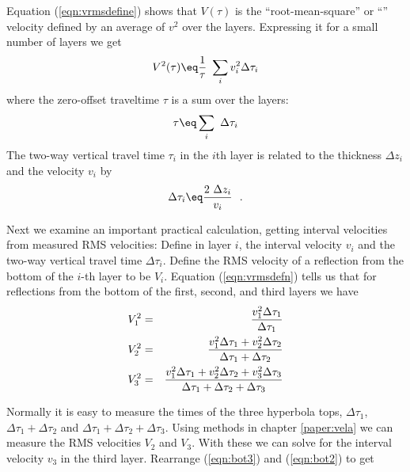 \par
Equation (\ref{eqn:vrmsdefine}) shows that
$V(\tau)$
is
the ``root-mean-square'' or
``\RMS'' velocity defined by
an average of $v^2$ over the layers.
Expressing it for a small number of layers we get
\begin{equation}
V^2(\tau) \eq \frac{1}{\tau}\  \sum_i v^2_i \Delta\tau_i
\label{eqn:vrmsdefn}
\end{equation}
where the zero-offset traveltime $\tau$ is a sum over the layers:
\begin{equation}
\tau \eq \sum_i \ \Delta\tau_i
\label{eqn:onetaudefn}
\end{equation}
The two-way vertical travel time $\tau_i$
in the $i$th layer is related to the
thickness $\Delta z_i$ and the velocity $v_i$  by
\begin{equation}
\Delta\tau_i \eq  \frac{2\ \Delta z_i}{v_i}  \ \ .
\label{eqn:twotaudefn}
\end{equation}
\par
Next we examine an important practical calculation,
getting interval velocities from measured RMS velocities:
Define
in layer $i$,
the interval velocity $v_i$
and the two-way vertical travel time $\Delta\tau_i$.
Define the RMS velocity
of a reflection
from the bottom of the $i$-th layer
to be $V_i$.
Equation (\ref{eqn:vrmsdefn}) tells us that for
reflections from the bottom of the first, second, and third layers we have
\begin{eqnarray}
V_1^2 &=& {v_1^2\Delta\tau_1
                               \over \Delta\tau_1                 }
\\
\label{eqn:bot2}
V_2^2 &=& {v_1^2\Delta\tau_1+ v_2^2\Delta\tau_2
                               \over \Delta\tau_1 + \Delta\tau_2        }
\\
\label{eqn:bot3}
V_3^2 &=& {v_1^2\Delta\tau_1+ v_2^2\Delta\tau_2 +v_3^2\Delta\tau_3
                               \over \Delta\tau_1 + \Delta\tau_2 +\Delta\tau_3}
\end{eqnarray}

Normally it is easy to measure the times of the three hyperbola tops,
$\Delta\tau_1$,
$\Delta\tau_1 + \Delta\tau_2$
and
$\Delta\tau_1 + \Delta\tau_2 +\Delta\tau_3$.
Using methods in chapter \ref{paper:vela}
we can measure the RMS velocities $V_2$ and $V_3$.
With these we can solve for the interval velocity $v_3$ in the third layer.
Rearrange (\ref{eqn:bot3}) and (\ref{eqn:bot2}) to get

